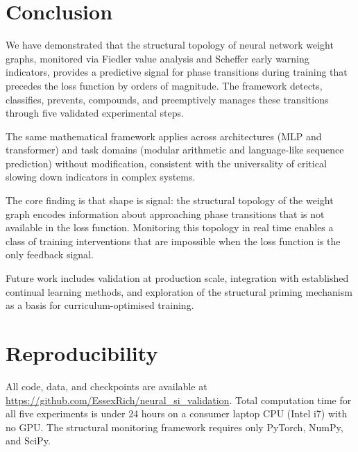 \documentclass[10pt,twocolumn]{article}
\begin{document}
\section{Conclusion}

We have demonstrated that the structural topology of neural network weight graphs, monitored via Fiedler value analysis and Scheffer early warning indicators, provides a predictive signal for phase transitions during training that precedes the loss function by orders of magnitude. The framework detects, classifies, prevents, compounds, and preemptively manages these transitions through five validated experimental steps.

The same mathematical framework applies across architectures (MLP and transformer) and task domains (modular arithmetic and language-like sequence prediction) without modification, consistent with the universality of critical slowing down indicators in complex systems.

The core finding is that shape is signal: the structural topology of the weight graph encodes information about approaching phase transitions that is not available in the loss function. Monitoring this topology in real time enables a class of training interventions that are impossible when the loss function is the only feedback signal.

Future work includes validation at production scale, integration with established continual learning methods, and exploration of the structural priming mechanism as a basis for curriculum-optimised training.

\section*{Reproducibility}

All code, data, and checkpoints are available at \url{https://github.com/EssexRich/neural_si_validation}. Total computation time for all five experiments is under 24 hours on a consumer laptop CPU (Intel i7) with no GPU. The structural monitoring framework requires only PyTorch, NumPy, and SciPy.



\end{document}
